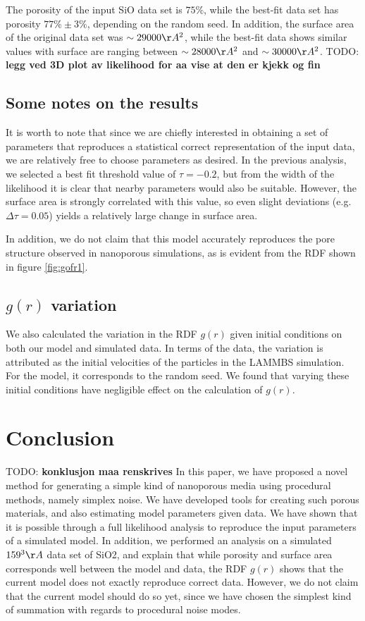 \documentclass[aps,pre,twocolumn,letterpaper,floatfix,showpacs]{revtex4}
\newcommand{\todo}[1]{ {\color{Magenta} TODO: \color{Blue} \textbf{#1} }}
\begin{document}
The porosity of the input SiO data set is $75\%$, while the best-fit data set has porosity $77\% \pm 3 \%$, depending on the random seed. In addition, the surface area of the original data set was $\sim 29 000 \AA^2$, while the best-fit data shows similar values with surface are ranging between $\sim 28 000 \AA^2$ and $\sim 30 000 \AA^2$.
\todo{legg ved 3D plot av likelihood for aa vise at den er kjekk og fin}

\subsection{Some notes on the results}
It is worth to note that since we are chiefly interested in obtaining a set of parameters that reproduces a statistical correct representation of the input data, we are relatively free to choose parameters as desired. In the previous analysis, we selected a best fit threshold value of $\tau=-0.2$, but from the width of the likelihood it is clear that nearby parameters would also be suitable. However, the surface area is strongly correlated with this value, so even slight deviations (e.g. $\Delta \tau = 0.05$) yields a relatively large change in surface area. 

In addition, we do not claim that this model accurately reproduces the pore structure observed in nanoporous simulations, as is evident from the RDF shown in figure \ref{fig:gofr1}.

\subsection{$g(r)$ variation}
We also calculated the variation in the RDF $g(r)$ given initial conditions on both our model and simulated data. In terms of the data, the variation is attributed as the initial velocities of the particles in the LAMMBS simulation. For the model, it corresponds to the random seed. We found that varying these initial conditions have negligible effect on the calculation of $g(r)$.





\section{Conclusion}
\todo{konklusjon maa renskrives}
In this paper, we have proposed a novel method for generating a simple kind of nanoporous media using procedural methods, namely simplex noise. We have developed tools for creating such porous materials, and also estimating model parameters given data. We have shown that it is possible through a full likelihood analysis to reproduce the input parameters of a simulated model. In addition, we performed an analysis on a simulated $159^3 \AA$ data set of SiO2, and explain that while porosity and surface area corresponds well between the model and data, the RDF $g(r)$ shows that the current model does not exactly reproduce correct data. However, we do not claim that the current model should do so yet, since we have chosen the simplest kind of summation with regards to procedural noise modes. 
\end{document}
